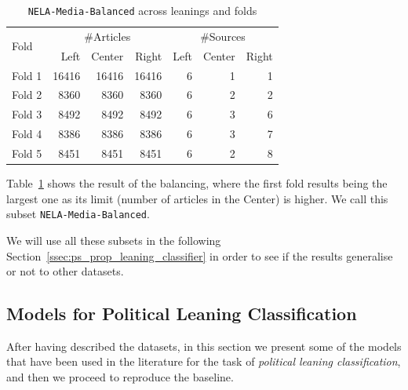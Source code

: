 \begin{table}[!htbp]
    \centering
    \begin{tabular}{l|rrr|rrr}
        \multirow{2}{*}{Fold} & \multicolumn{3}{c}{\#Articles} & \multicolumn{3}{c}{\#Sources} \\
         & Left & Center & Right & Left & Center & Right \\
        \hline
        Fold 1 & 16416 & 16416 & 16416 & 6 & 1 & 1 \\
        Fold 2 & 8360 & 8360 & 8360 & 6 & 2 & 2 \\
        Fold 3 & 8492 & 8492 & 8492 & 6 & 3 & 6 \\
        Fold 4 & 8386 & 8386 & 8386 & 6 & 3 & 7 \\
        Fold 5 & 8451 & 8451 & 8451 & 6 & 2 & 8 \\
    \end{tabular}
    \caption{\texttt{NELA-Media-Balanced} across leanings and folds}
    \label{tab:nela_media_balanced}
\end{table}

Table~\ref{tab:nela_media_balanced} shows the result of the balancing, where the first fold results being the largest one as its limit (number of articles in the Center) is higher.
We call this subset \texttt{NELA-Media-Balanced}.

We will use all these subsets in the following Section~\ref{ssec:ps_prop_leaning_classifier} in order to see if the results generalise or not to other datasets.


\subsection{\statusgreen Models for Political Leaning Classification}
\label{ssec:ps_leaning_models}




After having described the datasets, in this section we present some of the models that have been used in the literature for the task of \emph{political leaning classification}, and then we proceed to reproduce the baseline.


